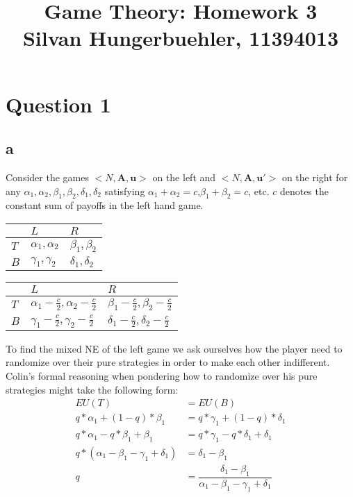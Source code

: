 \documentclass[10pt,a4paper]{article}
\title{%
  Game Theory: Homework 3 \\
  \large Silvan Hungerbuehler, 11394013}
\date{}
\begin{document}
\maketitle

\section*{Question 1}
\subsection*{a}
Consider the games $<N,\boldsymbol{A},\boldsymbol{u}>$ on the left and $<N,\boldsymbol{A},\boldsymbol{u'}>$ on the right for any $\alpha_1,\alpha_2,\beta_1,\beta_2,\delta_1,\delta_2$ satisfying $\alpha_1+\alpha_2=c$,$\beta_1+\beta_2=c$, etc. $c$ denotes the constant sum of payoffs in the left hand game.
\begin{table}[h]
\centering
\begin{tabular}[l]{|l|l|l|}
\hline
          & $L$ & $R$  \\ \hline
$T$     & $\alpha_1,\alpha_2$   & $\beta_1,\beta_2$ \\ \hline
$B$		& $\gamma_1,\gamma_2$	& $\delta_1,\delta_2$ \\ \hline
\end{tabular}
\quad
\begin{tabular}[r]{|l|l|l|}
\hline
          & $L$ & $R$  \\ \hline
$T$     & $\alpha_1-\tfrac{c}{2},\alpha_2-\tfrac{c}{2}$   & $\beta_1-\tfrac{c}{2},\beta_2-\tfrac{c}{2}$ \\ \hline
$B$		& $\gamma_1-\tfrac{c}{2},\gamma_2-\tfrac{c}{2}$	& $\delta_1-\tfrac{c}{2},\delta_2-\tfrac{c}{2}$ \\ \hline
\end{tabular}
\end{table}
To find the mixed NE of the left game we ask ourselves how the player need to randomize over their pure strategies in order to make each other indifferent. Colin's formal reasoning when pondering how to randomize over his pure strategies might take the following form:\\
\begin{align*}
EU(T)&=EU(B) \\
q*\alpha_1+(1-q)*\beta_1&=q*\gamma_1+(1-q)*\delta_1 \\
q*\alpha_1-q*\beta_1+\beta_1&=q*\gamma_1-q*\delta_1+\delta_1 \\
q*(\alpha_1-\beta_1-\gamma_1+\delta_1)&=\delta_1-\beta_1 \\
q &= \dfrac{\delta_1-\beta_1}{\alpha_1-\beta_1-\gamma_1+\delta_1}
\end{align*}
\end{document}
